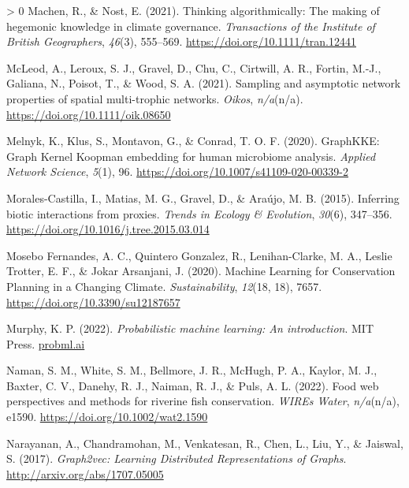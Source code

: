 \documentclass[10pt,oneside]{article}
\newlength{\cslhangindent}
\newenvironment{CSLReferences}[3] %
 {%
  \setlength{\parindent}{0pt}
  \ifodd #1 \everypar{\setlength{\hangindent}{\cslhangindent}}\ignorespaces\fi
  \ifnum #2 > 0
  \setlength{\parskip}{#2\baselineskip}
  \fi
 }%
 {}
\begin{document}
\begin{CSLReferences}{1}{0}
\leavevmode\hypertarget{ref-Machen2021ThiAlg}{}%
Machen, R., \& Nost, E. (2021). Thinking algorithmically: The making of
hegemonic knowledge in climate governance. \emph{Transactions of the
Institute of British Geographers}, \emph{46}(3), 555--569.
\url{https://doi.org/10.1111/tran.12441}

\leavevmode\hypertarget{ref-McLeod2021SamAsy}{}%
McLeod, A., Leroux, S. J., Gravel, D., Chu, C., Cirtwill, A. R., Fortin,
M.-J., Galiana, N., Poisot, T., \& Wood, S. A. (2021). Sampling and
asymptotic network properties of spatial multi-trophic networks.
\emph{Oikos}, \emph{n/a}(n/a). \url{https://doi.org/10.1111/oik.08650}

\leavevmode\hypertarget{ref-Melnyk2020GraGra}{}%
Melnyk, K., Klus, S., Montavon, G., \& Conrad, T. O. F. (2020).
GraphKKE: Graph Kernel Koopman embedding for human microbiome analysis.
\emph{Applied Network Science}, \emph{5}(1), 96.
\url{https://doi.org/10.1007/s41109-020-00339-2}

\leavevmode\hypertarget{ref-Morales-Castilla2015InfBio}{}%
Morales-Castilla, I., Matias, M. G., Gravel, D., \& Araújo, M. B.
(2015). Inferring biotic interactions from proxies. \emph{Trends in
Ecology \& Evolution}, \emph{30}(6), 347--356.
\url{https://doi.org/10.1016/j.tree.2015.03.014}

\leavevmode\hypertarget{ref-MoseboFernandes2020MacLea}{}%
Mosebo Fernandes, A. C., Quintero Gonzalez, R., Lenihan-Clarke, M. A.,
Leslie Trotter, E. F., \& Jokar Arsanjani, J. (2020). Machine Learning
for Conservation Planning in a Changing Climate. \emph{Sustainability},
\emph{12}(18, 18), 7657. \url{https://doi.org/10.3390/su12187657}

\leavevmode\hypertarget{ref-Murphy2022ProMac}{}%
Murphy, K. P. (2022). \emph{Probabilistic machine learning: An
introduction}. MIT Press. \href{https://probml.ai}{probml.ai}

\leavevmode\hypertarget{ref-Naman2022FooWeb}{}%
Naman, S. M., White, S. M., Bellmore, J. R., McHugh, P. A., Kaylor, M.
J., Baxter, C. V., Danehy, R. J., Naiman, R. J., \& Puls, A. L. (2022).
Food web perspectives and methods for riverine fish conservation.
\emph{WIREs Water}, \emph{n/a}(n/a), e1590.
\url{https://doi.org/10.1002/wat2.1590}

\leavevmode\hypertarget{ref-Narayanan2017GraLea}{}%
Narayanan, A., Chandramohan, M., Venkatesan, R., Chen, L., Liu, Y., \&
Jaiswal, S. (2017). \emph{Graph2vec: Learning Distributed
Representations of Graphs}. \url{http://arxiv.org/abs/1707.05005}


\end{CSLReferences}
\end{document}
